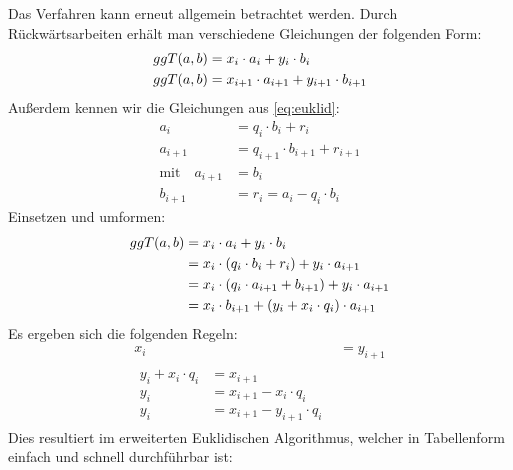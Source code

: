 \noindent
Das Verfahren kann erneut allgemein betrachtet werden. Durch Rückwärtsarbeiten erhält
man verschiedene Gleichungen der folgenden Form:
\begin{align*}
  ggT(a,b) & = x_i \cdot a_i + y_i \cdot b_i                 \\
  ggT(a,b) & = x_{i+1} \cdot a_{i+1} + y_{i+1} \cdot b_{i+1}
\end{align*}
Außerdem kennen wir die Gleichungen aus \eqref{eq:euklid}:
\begin{align*}
  a_i                      & = q_i \cdot b_i + r_i             \\
  a_{i+1}                  & = q_{i+1} \cdot b_{i+1} + r_{i+1} \\
  \text{mit} \quad a_{i+1} & = b_i                             \\
  b_{i+1}                  & = r_i = a_i - q_i \cdot b_i
\end{align*}
Einsetzen und umformen:
\begin{align*}
  ggT(a,b) & = x_i \cdot a_i + y_i \cdot b_i                               \\
             & = x_i \cdot (q_i \cdot b_i + r_i) + y_i \cdot a_{i+1}         \\
             & = x_i \cdot (q_i \cdot a_{i+1} + b_{i+1}) + y_i \cdot a_{i+1} \\
             & = x_i \cdot b_{i+1} + (y_i + x_i \cdot q_i) \cdot a_{i+1}
\end{align*}
Es ergeben sich die folgenden Regeln:
\begin{align}
  x_i & = y_{i+1} \\
  \begin{split}
    y_i + x_i \cdot q_i &= x_{i+1} \\
    y_i &= x_{i+1} - x_i \cdot q_i \\
    y_i &= x_{i+1} - y_{i+1} \cdot q_i
  \end{split}
\end{align}
Dies resultiert im erweiterten Euklidischen Algorithmus, welcher in Tabellenform
einfach und schnell durchführbar ist:

